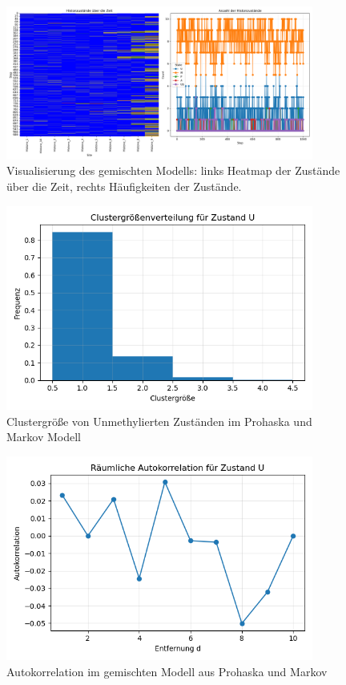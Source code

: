 \documentclass{SeminarV2}
\begin{document}
\begin{figure}[htbp]
  \centering
  \includegraphics[width=0.9\textwidth]{images/Histone_Prohaska_and_Markov_1000.png}
  \caption{Visualisierung des gemischten Modells: links Heatmap der Zustände über die Zeit, rechts Häufigkeiten der Zustände.}
  \label{fig:PM_1000}
\end{figure}

\begin{figure} [htbp]
  \centering
  \includegraphics[width=0.9\textwidth]{images/Histone_Prohaska_and_Markov_1000_cluster.png}
  \caption{Clustergröße von Unmethylierten Zuständen im Prohaska und Markov Modell}
  \label{fig:PM_1000_C}
  \end{figure}

\begin{figure}
  \centering
  \includegraphics[width=0.9\textwidth]{images/Histone_Prohaska_and_Markov_1000_Autokorrelation.png}
  \caption{Autokorrelation im gemischten Modell aus Prohaska und Markov}
  \label{fig:PM_1000_A}
\end{figure}

\newpage

\begin{footnotesize}


\end{footnotesize}
\end{document}
